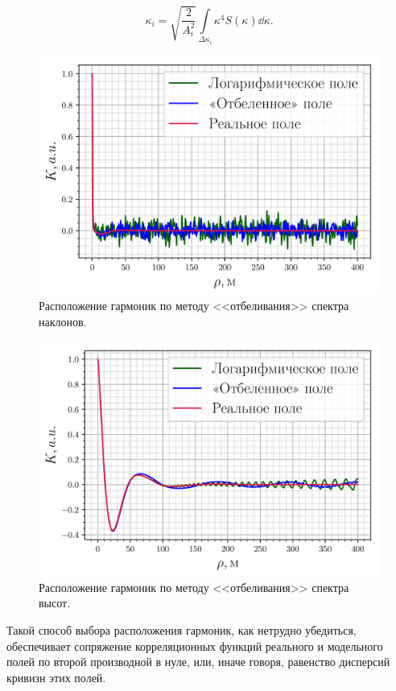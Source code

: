 \documentclass[a4paper,14pt]{extarticle}
\begin{document}
\begin{equation}
    \label{eq:ki_slopes}
    \boxed{
        \kappa_i = \sqrt{\frac{2}{A_{i}^2}} \int\limits_{\Delta \kappa_i}
        \kappa^4 S(\kappa) \dd \kappa. 
    }
\end{equation}

\begin{figure}[ht]
    \centering
    \includegraphics[width=0.6\linewidth]{fig/correlation_angles_wa.png}
    \caption{ Расположение гармоник по методу <<отбеливания>> спектра
    наклонов. }
    \label{fig:nodes}
\end{figure}

\begin{figure}[ht]
    \centering
    \includegraphics[width=0.6\linewidth]{fig/correlation_height_wa.png}
    \caption{ Расположение гармоник по методу <<отбеливания>> спектра
    высот. }
\end{figure}
Такой способ выбора расположения гармоник, как нетрудно убедиться, обеспечивает
сопряжение корреляционных функций реального и модельного полей по второй
производной в нуле, или, иначе говоря, равенство дисперсий кривизн этих
полей.
\end{document}
